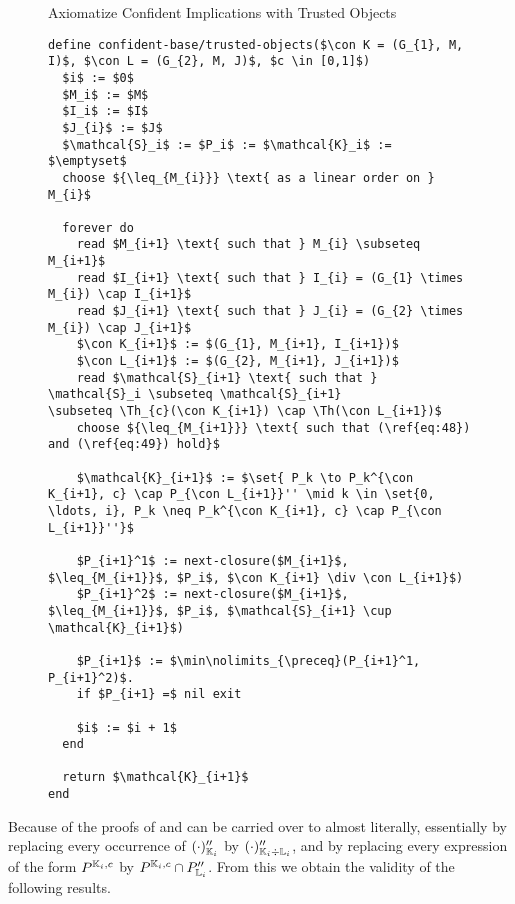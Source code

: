 \begin{figure}[tp]
  \begin{Algorithm} Axiomatize Confident Implications with Trusted Objects
    \hspace*{0cm}
    \label{alg:confident-base/growing-attributes-trusted-objects}
    \begin{lstlisting}
define confident-base/trusted-objects($\con K = (G_{1}, M, I)$, $\con L = (G_{2}, M, J)$, $c \in [0,1]$)
  $i$ := $0$
  $M_i$ := $M$
  $I_i$ := $I$
  $J_{i}$ := $J$
  $\mathcal{S}_i$ := $P_i$ := $\mathcal{K}_i$ := $\emptyset$
  choose ${\leq_{M_{i}}} \text{ as a linear order on } M_{i}$
  
  forever do
    read $M_{i+1} \text{ such that } M_{i} \subseteq M_{i+1}$
    read $I_{i+1} \text{ such that } I_{i} = (G_{1} \times M_{i}) \cap I_{i+1}$
    read $J_{i+1} \text{ such that } J_{i} = (G_{2} \times M_{i}) \cap J_{i+1}$
    $\con K_{i+1}$ := $(G_{1}, M_{i+1}, I_{i+1})$
    $\con L_{i+1}$ := $(G_{2}, M_{i+1}, J_{i+1})$
    read $\mathcal{S}_{i+1} \text{ such that } \mathcal{S}_i \subseteq \mathcal{S}_{i+1}
\subseteq \Th_{c}(\con K_{i+1}) \cap \Th(\con L_{i+1})$
    choose ${\leq_{M_{i+1}}} \text{ such that (\ref{eq:48}) and (\ref{eq:49}) hold}$

    $\mathcal{K}_{i+1}$ := $\set{ P_k \to P_k^{\con K_{i+1}, c} \cap P_{\con L_{i+1}}'' \mid k \in \set{0, \ldots, i}, P_k \neq P_k^{\con K_{i+1}, c} \cap P_{\con L_{i+1}}''}$

    $P_{i+1}^1$ := next-closure($M_{i+1}$, $\leq_{M_{i+1}}$, $P_i$, $\con K_{i+1} \div \con L_{i+1}$)
    $P_{i+1}^2$ := next-closure($M_{i+1}$, $\leq_{M_{i+1}}$, $P_i$, $\mathcal{S}_{i+1} \cup \mathcal{K}_{i+1}$)

    $P_{i+1}$ := $\min\nolimits_{\preceq}(P_{i+1}^1, P_{i+1}^2)$.
    if $P_{i+1} =$ nil exit

    $i$ := $i + 1$
  end

  return $\mathcal{K}_{i+1}$  
end
    \end{lstlisting}
  \end{Algorithm}
\end{figure}

Because of  the proofs of
 and
 can be carried over to
 almost literally, essentially
by replacing every occurrence of $(\cdot)_{{\mathbb{K}}_{i}}''$ by $(\cdot)_{{\mathbb{K}}_{i} \div
  {\ensuremath{\mathbb{L}}}_{i}}''$, and by replacing every expression of the form $P^{{\mathbb{K}}_{i}, c}$ by
$P^{{\mathbb{K}}_{i}, c} \cap P_{{\mathbb{L}}_{i}}''$.  From this we obtain the validity of the
following results.

